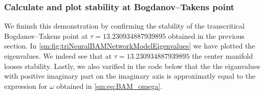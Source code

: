 \subsubsection{Calculate and plot stability at Bogdanov--Takens point}
We fininsh this demonstration by confirming the stability
of the transcritical Bogdanov--Takens point at $\tau = 13.230934887939895$
obtained in the previous section. In \cref{sm:fig:triNeuralBAMNetworkModelEigenvalues}
we have plotted the eigenvalues. We indeed see that at $\tau = 13.230934887939895$
the center manifold looses stability. Lastly, we also varified in the code
below that the the eiganvalues with positive imaginary part on the imaginary axis
is approximatly equal to the expression for $\omega$ obtained in \cref{sm:eq:BAM_omega}. 
\inputminted[firstline=459, lastline=467]{julia}{\pathToJuliaFiles/triNeuralBAMNetworkModel_simulation_article.jl}

